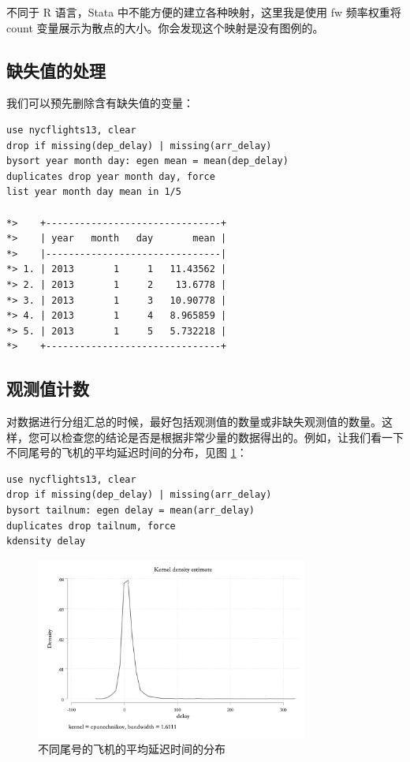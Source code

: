 \documentclass[]{ctexbook}
\begin{document}
不同于 R 语言，Stata 中不能方便的建立各种映射，这里我是使用 fw 频率权重将 count 变量展示为散点的大小。你会发现这个映射是没有图例的。

\hypertarget{section-52}{%
\subsection{缺失值的处理}\label{section-52}}

我们可以预先删除含有缺失值的变量：

\begin{lstlisting}
use nycflights13, clear
drop if missing(dep_delay) | missing(arr_delay)
bysort year month day: egen mean = mean(dep_delay)
duplicates drop year month day, force
list year month day mean in 1/5

*>    +-------------------------------+
*>    | year   month   day       mean |
*>    |-------------------------------|
*> 1. | 2013       1     1   11.43562 |
*> 2. | 2013       1     2    13.6778 |
*> 3. | 2013       1     3   10.90778 |
*> 4. | 2013       1     4   8.965859 |
*> 5. | 2013       1     5   5.732218 |
*>    +-------------------------------+
\end{lstlisting}

\hypertarget{section-53}{%
\subsection{观测值计数}\label{section-53}}

对数据进行分组汇总的时候，最好包括观测值的数量或非缺失观测值的数量。这样，您可以检查您的结论是否是根据非常少量的数据得出的。例如，让我们看一下不同尾号的飞机的平均延迟时间的分布，见图 \ref{fig:kdensitydelay}：

\begin{lstlisting}
use nycflights13, clear
drop if missing(dep_delay) | missing(arr_delay)
bysort tailnum: egen delay = mean(arr_delay)
duplicates drop tailnum, force
kdensity delay
\end{lstlisting}

\begin{figure}

{\centering \includegraphics[width=0.8\textwidth]{assets/kdensitydelay} 

}

\caption{不同尾号的飞机的平均延迟时间的分布}\label{fig:kdensitydelay}
\end{figure}
\end{document}

